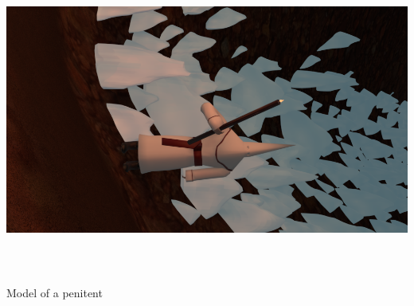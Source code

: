 \documentclass[12pt,a4paper,titlepage,final,tikz,border=4mm]{report}
\begin{document}
\begin {center}
\includegraphics [height = 10cm,angle =90 ] {foto.png}
\caption {Model of a penitent}
\end {center}

 


\end{document}
